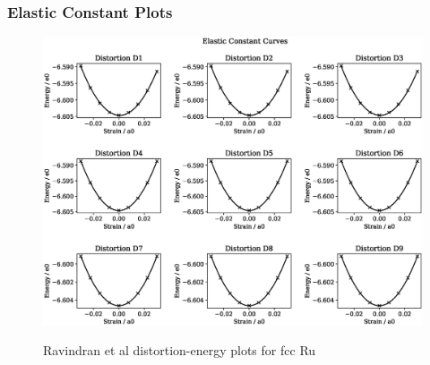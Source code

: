 \clearpage
\subsubsection{Elastic Constant Plots}

\begin{figure}[htb]
\centering
\includegraphics[width=.90\linewidth]{chapters/potentials_fe_pd_ru/feru_potential/ec_rfkj/elastic_strains_bp_2.eps}  
\label{fig:feru-fefcc-rose}
\caption{Ravindran et al\cite{dfttisiravindran} distortion-energy plots for \acrshort{fcc} Ru}
\end{figure}

